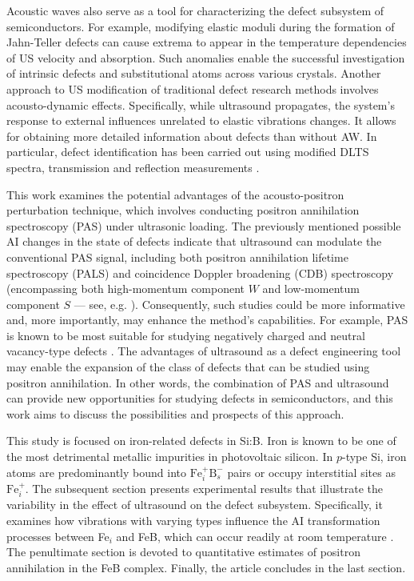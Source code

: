 \documentclass{ttp}
\begin{document}
Acoustic waves also serve as a tool for characterizing the defect subsystem of semiconductors.
For example, modifying elastic moduli during the formation of Jahn-Teller defects can cause extrema to appear in the temperature dependencies of US velocity and absorption.
Such anomalies enable the successful investigation of intrinsic defects \cite{USM:Mitsumoto2014, USM:SEYIDOV2016}
and substitutional atoms \cite{USM:Zhevstovskikh, USM:YI2009} across various crystals.
Another approach to US modification of traditional defect research methods involves acousto-dynamic effects.
Specifically, while ultrasound propagates, the system's response to external influences unrelated to elastic vibrations changes.
It allows for obtaining more detailed information about defects than without AW.
In particular, defect identification has been carried out using modified DLTS spectra,
transmission and reflection measurements \cite{Kor1996, Ostrovskii2001, OSTROVSKII2000, SST:USmethod}.

This work examines the potential advantages of the acousto-positron perturbation technique,
which involves conducting positron annihilation spectroscopy (PAS) under ultrasonic loading.
The previously mentioned possible AI changes in the state of defects indicate that ultrasound can modulate the conventional PAS signal,
including both positron annihilation lifetime spectroscopy (PALS) and coincidence Doppler broadening (CDB) spectroscopy
(encompassing both high-momentum component $W$ and low-momentum component $S$ --- see, e.g. \cite{Krause1999}).
Consequently, such studies could be more informative and, more importantly, may enhance the method's capabilities.
For example, PAS is known to be most suitable for studying negatively charged and neutral vacancy-type defects \cite{Makkonen2024,Tuomisto2013}.
The advantages of ultrasound as a defect engineering tool \cite{Olikh2018JAP} may enable the expansion
of the class of defects that can be studied using positron annihilation.
In other words, the combination of PAS and ultrasound can provide new opportunities for studying defects in semiconductors,
and this work aims to discuss the possibilities and prospects of this approach.

This study is focused on iron-related defects in Si:B.
Iron is known to be one of the most detrimental metallic impurities in photovoltaic silicon.
In $p$-type Si, iron atoms are predominantly bound into $\mathrm{Fe}_i^+\mathrm{B}_s^−$ pairs
or occupy interstitial sites as $\mathrm{Fe}_i^+$.
The subsequent section presents experimental results that illustrate the variability in the effect of ultrasound on the defect subsystem.
Specifically, it examines how vibrations with varying types influence the AI transformation processes
between Fe$_i$ and FeB, which can occur readily at room temperature \cite{FeBAssJAP2014}.
The penultimate section is devoted to quantitative estimates of positron annihilation in the FeB complex.
Finally, the article concludes in the last section.
\end{document}
